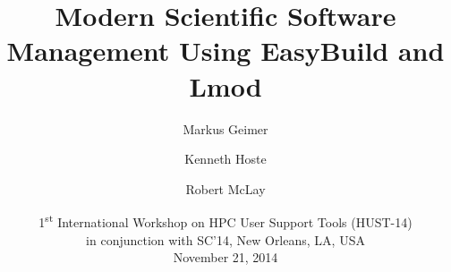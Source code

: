 \documentclass[10pt,xcolor={usenames,dvipsnames}]{beamer}
\begin{document}

\title{\textbf{Modern Scientific Software Management Using EasyBuild and Lmod}}
\author{%
    Markus Geimer%
    \and%
    Kenneth Hoste%
    \and
    Robert McLay%
}
\date{%
    \small%
    1\textsuperscript{st} International Workshop on HPC User Support Tools (HUST-14)\\%
    in conjunction with SC'14, New Orleans, LA, USA\\%
    November 21, 2014%
}

\begin{frame}[noframenumbering]
\titlepage
\end{frame}



\end{document}
